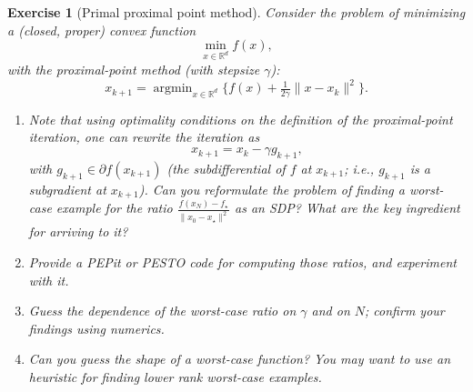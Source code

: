 \documentclass[11pt,a4paper]{article}
\DeclareMathOperator*{\argmin}{argmin}
\newcommand{\pesto}{{PESTO }}
\newcommand{\pepit}{{PEPit }}
\newtheorem{exercise}{Exercise}
\begin{document}
	\begin{exercise}[Primal proximal point method]\label{ex:ppm}
	Consider the problem of minimizing a (closed, proper) convex function
	\[ \min_{x\in\mathbb{R}^d} f(x),\]
	with the proximal-point method (with stepsize $\gamma$):
	\[ x_{k+1}=\argmin_{x\in\mathbb{R}^d} \{ f(x)+\tfrac{1}{2\gamma}\|x-x_k\|^2\}.\]
	\begin{enumerate}
	\item Note that using optimality conditions on the definition of the proximal-point iteration, one can rewrite the iteration as
	\[ x_{k+1} = x_k - \gamma g_{k+1}, \]
	with $g_{k+1}\in\partial f(x_{k+1})$ (the subdifferential of $f$ at $x_{k+1}$; i.e., $g_{k+1}$ is a subgradient at $x_{k+1}$). Can you reformulate the problem of finding a worst-case example for the ratio $\frac{f(x_N)-f_\star}{\|x_0-x_\star\|^2}$ as an SDP? What are the key ingredient for arriving to it?
	\item Provide a \pepit or \pesto code for computing those ratios, and experiment with it.
	\item Guess the dependence of the worst-case ratio on $\gamma$ and on $N$; confirm your findings using numerics.
	
	\item Can you guess the shape of a worst-case function? You may want to use an heuristic for finding lower rank worst-case examples.
	\end{enumerate}
	\end{exercise}
	
\end{document}
